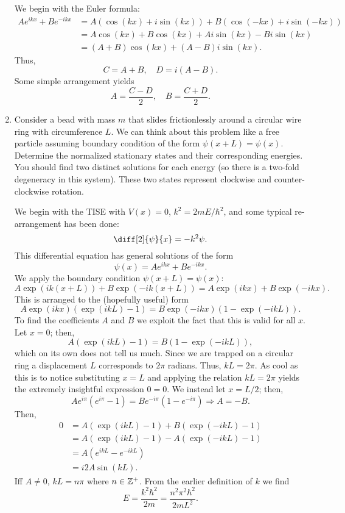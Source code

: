 \documentclass[a4paper, 12pt]{config/homework}
\begin{document}
\begin{enumerate}
We begin with the Euler formula:
\begin{align*}
Ae^{ikx} + Be^{-ikx} &= A\left(\cos(kx) + i \sin(kx)\right) + B\left(\cos(-kx) + i\sin(-kx)\right)
\\&= A\cos(kx) + B\cos(kx) + Ai\sin(kx) - Bi\sin(kx)
\\&= (A+B)\cos(kx) + (A-B)i\sin(kx).
\end{align*}
Thus,
\[C = A+B,\quad D=i(A-B).\]
Some simple arrangement yields
\[A = \frac{C-D}{2}, \quad B = \frac{C+D}{2}.\]

\item Consider a bead with mass \(m\) that slides frictionlessly around a circular wire ring with circumference \(L\). We can think about this problem like a free particle assuming boundary condition of the form \(\psi(x+L) = \psi(x)\). Determine the normalized stationary states and their corresponding energies. You should find two distinct solutions for each energy (so there is a two-fold degeneracy in this system). These two states represent clockwise and counter-clockwise rotation.

We begin with the TISE with \(V(x)=0\), \(k^2=2mE/\hbar^2\), and some typical re-arrangement has been done:
\[\diff[2]{\psi}{x} = -k^2\psi.\]
This differential equation has general solutions of the form
\[\psi(x) = Ae^{ikx} + Be^{-ikx}.\]
We apply the boundary condition \(\psi(x+L) = \psi(x)\):
\[A\exp\left(ik(x+L)\right) + B\exp\left(-ik(x+L)\right) = A\exp\left(ikx\right) + B\exp\left(-ikx\right).\]
This is arranged to the (hopefully useful) form
\[A\exp(ikx)\left(\exp(ikL)-1\right) = B\exp(-ikx)\left(1-\exp(-ikL)\right).\]
To find the coefficients \(A\) and \(B\) we exploit the fact that this is valid for all \(x\). Let \(x=0\); then,
\[A\left(\exp(ikL) - 1\right) = B\left(1-\exp(-ikL)\right),\]
which on its own does not tell us much. Since we are trapped on a circular ring a displacement \(L\) corresponds to \(2\pi\) radians. Thus, \(kL=2\pi\). As cool as this is to notice substituting \(x=L\) and applying the relation \(kL=2\pi\) yields the extremely insightful expression \(0=0\). We instead let \(x=L/2\); then,
\[Ae^{i\pi}\left(e^{i\pi}-1\right) = Be^{-i\pi}\left(1 - e^{-i\pi}\right) \Rightarrow A = -B.\]
Then,
\begin{align*}
0 &= A\left(\exp(ikL) - 1\right) + B\left(\exp(-ikL)-1\right)
\\&= A\left(\exp(ikL) - 1\right) -A\left(\exp(-ikL)-1\right)
\\&= A\left(e^{ikL}-e^{-ikL}\right)
\\&= i2A\sin(kL).
\end{align*}
Iff \(A\ne 0\), \(kL=n\pi\) where \(n\in\mathbb{Z}^+\). From the earlier definition of \(k\) we find
\[E = \frac{k^2\hbar^2}{2m} = \frac{n^2 \pi^2 \hbar^2}{2mL^2}.\]


\end{enumerate}
\end{document}
